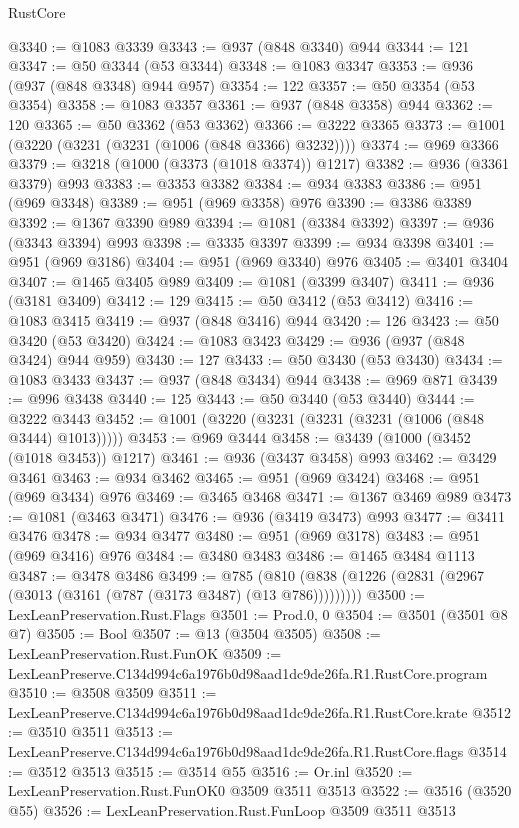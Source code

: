 \begin{lexlean}{RustCore}
\begin{coremodule}
@3340 := @1083 @3339
@3343 := @937 (@848 @3340) @944
@3344 := 121
@3347 := @50 @3344 (@53 @3344)
@3348 := @1083 @3347
@3353 := @936 (@937 (@848 @3348) @944 @957)
@3354 := 122
@3357 := @50 @3354 (@53 @3354)
@3358 := @1083 @3357
@3361 := @937 (@848 @3358) @944
@3362 := 120
@3365 := @50 @3362 (@53 @3362)
@3366 := @3222 @3365
@3373 := @1001 (@3220 (@3231 (@3231 (@1006 (@848 @3366) @3232))))
@3374 := @969 @3366
@3379 := @3218 (@1000 (@3373 (@1018 @3374)) @1217)
@3382 := @936 (@3361 @3379) @993
@3383 := @3353 @3382
@3384 := @934 @3383
@3386 := @951 (@969 @3348)
@3389 := @951 (@969 @3358) @976
@3390 := @3386 @3389
@3392 := @1367 @3390 @989
@3394 := @1081 (@3384 @3392)
@3397 := @936 (@3343 @3394) @993
@3398 := @3335 @3397
@3399 := @934 @3398
@3401 := @951 (@969 @3186)
@3404 := @951 (@969 @3340) @976
@3405 := @3401 @3404
@3407 := @1465 @3405 @989
@3409 := @1081 (@3399 @3407)
@3411 := @936 (@3181 @3409)
@3412 := 129
@3415 := @50 @3412 (@53 @3412)
@3416 := @1083 @3415
@3419 := @937 (@848 @3416) @944
@3420 := 126
@3423 := @50 @3420 (@53 @3420)
@3424 := @1083 @3423
@3429 := @936 (@937 (@848 @3424) @944 @959)
@3430 := 127
@3433 := @50 @3430 (@53 @3430)
@3434 := @1083 @3433
@3437 := @937 (@848 @3434) @944
@3438 := @969 @871
@3439 := @996 @3438
@3440 := 125
@3443 := @50 @3440 (@53 @3440)
@3444 := @3222 @3443
@3452 := @1001 (@3220 (@3231 (@3231 (@3231 (@1006 (@848 @3444) @1013)))))
@3453 := @969 @3444
@3458 := @3439 (@1000 (@3452 (@1018 @3453)) @1217)
@3461 := @936 (@3437 @3458) @993
@3462 := @3429 @3461
@3463 := @934 @3462
@3465 := @951 (@969 @3424)
@3468 := @951 (@969 @3434) @976
@3469 := @3465 @3468
@3471 := @1367 @3469 @989
@3473 := @1081 (@3463 @3471)
@3476 := @936 (@3419 @3473) @993
@3477 := @3411 @3476
@3478 := @934 @3477
@3480 := @951 (@969 @3178)
@3483 := @951 (@969 @3416) @976
@3484 := @3480 @3483
@3486 := @1465 @3484 @1113
@3487 := @3478 @3486
@3499 := @785 (@810 (@838 (@1226 (@2831 (@2967 (@3013 (@3161 (@787 (@3173 @3487) (@13 @786)))))))))
@3500 := LexLeanPreservation.Rust.Flags
@3501 := Prod.{0, 0}
@3504 := @3501 (@3501 @8 @7)
@3505 := Bool
@3507 := @13 (@3504 @3505)
@3508 := LexLeanPreservation.Rust.FunOK
@3509 := LexLeanPreserve.C134d994c6a1976b0d98aad1dc9de26fa.R1.RustCore.program
@3510 := @3508 @3509
@3511 := LexLeanPreserve.C134d994c6a1976b0d98aad1dc9de26fa.R1.RustCore.krate
@3512 := @3510 @3511
@3513 := LexLeanPreserve.C134d994c6a1976b0d98aad1dc9de26fa.R1.RustCore.flags
@3514 := @3512 @3513
@3515 := @3514 @55
@3516 := Or.inl
@3520 := LexLeanPreservation.Rust.FunOK0 @3509 @3511 @3513
@3522 := @3516 (@3520 @55)
@3526 := LexLeanPreservation.Rust.FunLoop @3509 @3511 @3513

\end{coremodule}
\end{lexlean}
